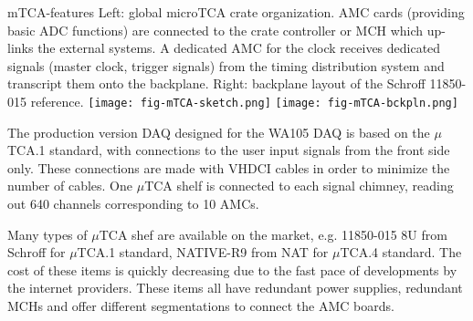 \begin{cdrfigure}{mTCA-features}
{\small Left: global microTCA crate organization. AMC cards 
(providing basic ADC functions) are connected to the crate 
controller or MCH which up-links the external systems. A dedicated 
AMC for the clock receives dedicated signals (master clock, trigger 
signals) from the timing distribution system and transcript them onto 
the backplane. Right: backplane layout of the Schroff 11850-015 reference.}
\texttt{[image: fig-mTCA-sketch.png]}\hfill
\texttt{[image: fig-mTCA-bckpln.png]}
\end{cdrfigure}

The production version DAQ designed for the WA105 DAQ is based on the
$\mu$TCA.1 standard, with connections to the user input signals from 
the front side only. These connections are made with VHDCI
cables in order to minimize the number of cables. One $\mu$TCA shelf
is connected to each signal chimney, reading out 640 channels corresponding to 10 AMCs.


Many types of  $\mu$TCA shef are available on the market, e.g.
11850-015 8U from Schroff for $\mu$TCA.1
standard, NATIVE-R9 from NAT for $\mu$TCA.4 standard. The cost of
these items is quickly decreasing due to the fast pace of
developments by the internet providers. These items all have redundant power
supplies, redundant MCHs and offer different segmentations to connect
the AMC boards.



